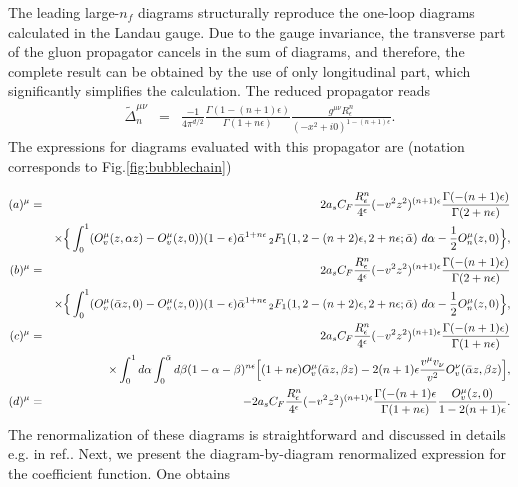 The leading large-$n_f$ diagrams structurally reproduce the one-loop diagrams calculated in the Landau gauge. Due to the gauge invariance, the transverse part of the gluon propagator cancels in the sum of diagrams, and therefore, the complete result can be obtained by the use of only longitudinal part, which significantly simplifies the calculation. The reduced propagator reads
\begin{eqnarray}
\tilde \Delta_n^{\mu\nu}&=&\frac{-1}{4\pi^{d/2}}
\frac{\Gamma(1-(n+1)\epsilon)}{\Gamma(1+n\epsilon)}\frac{g^{\mu\nu} R_\epsilon^n}{(-x^2+i0)^{1-(n+1)\epsilon}}.
\end{eqnarray}
The expressions for diagrams evaluated with this propagator are (notation corresponds to Fig.\ref{fig:bubblechain})
\begin{widetext}
\begin{eqnarray}
(a)^\mu &=&2a_sC_F \frac{R_\epsilon^n}{4^\epsilon}(-v^2z^2)^{(n+1)\epsilon}\frac{\Gamma(-(n+1)\epsilon)}{\Gamma(2+n\epsilon)}
\\&& \nonumber \hfill
\times\Big\{\int_0^1  
(O_v^\mu(z,\alpha z)-O_v^\mu(z,0))(1-\epsilon)\bar \alpha^{1+n\epsilon}\,_2F_1(1,2-(n+2)\epsilon,2+n\epsilon;\bar \alpha)~d\alpha-\frac{1}{2}O^\mu_n(z,0)\Big\},
\\
(b)^\mu &=&2a_sC_F \frac{R_\epsilon^n}{4^\epsilon}(-v^2z^2)^{(n+1)\epsilon}\frac{\Gamma(-(n+1)\epsilon)}{\Gamma(2+n\epsilon)}
\\&& \nonumber \hfill
\times\Big\{\int_0^1  
(O_v^\mu(\bar \alpha z,0)-O_v^\mu(z,0))(1-\epsilon)\bar \alpha^{1+n\epsilon}\,_2F_1(1,2-(n+2)\epsilon,2+n\epsilon;\bar \alpha)~d\alpha-\frac{1}{2}O^\mu_n(z,0)\Big\},
\\
(c)^\mu &=&2a_sC_F \frac{R_\epsilon^n}{4^\epsilon}(-v^2z^2)^{(n+1)\epsilon}\frac{\Gamma(-(n+1)\epsilon)}{\Gamma(1+n\epsilon)}
\\&& \nonumber \hfill
\times\int_0^1  d\alpha \int_0^{\bar \alpha} d\beta (1-\alpha-\beta)^{n\epsilon}\Big[(1+n\epsilon)O_v^\mu(\bar \alpha z,\beta z)-2(n+1)\epsilon \frac{v^\mu v_\nu}{v^2}O^\nu_v(\bar \alpha z,\beta z)\Big],
\\
(d)^\mu &=&-2a_sC_F \frac{R_\epsilon^n}{4^\epsilon}(-v^2z^2)^{(n+1)\epsilon}\frac{\Gamma(-(n+1)\epsilon}{\Gamma(1+n\epsilon)}\frac{O^\mu_v(z,0)}{1-2(n+1)\epsilon}.
\end{eqnarray}
The renormalization of these diagrams is straightforward and discussed in details e.g. in ref.\cite{Beneke:1995pq}. Next, we present the diagram-by-diagram renormalized expression for the coefficient function. One obtains
\begin{eqnarray}\label{app:a}

\end{eqnarray}
\end{widetext}
